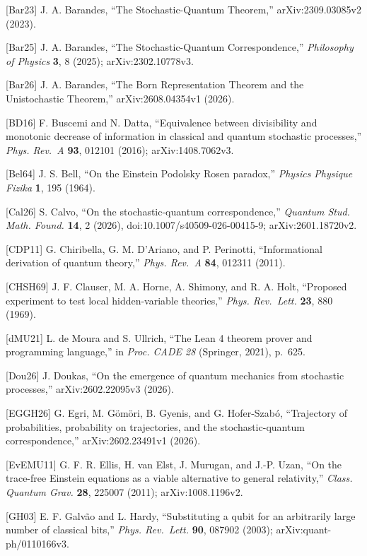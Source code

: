 \documentclass[
]{article}
\begin{document}
{[}Bar23{]} J. A. Barandes, ``The Stochastic-Quantum Theorem,''
arXiv:2309.03085v2 (2023).

{[}Bar25{]} J. A. Barandes, ``The Stochastic-Quantum Correspondence,''
\emph{Philosophy of Physics} \textbf{3}, 8 (2025); arXiv:2302.10778v3.

{[}Bar26{]} J. A. Barandes, ``The Born Representation Theorem and the
Unistochastic Theorem,'' arXiv:2608.04354v1 (2026).

{[}BD16{]} F. Buscemi and N. Datta, ``Equivalence between divisibility
and monotonic decrease of information in classical and quantum
stochastic processes,'' \emph{Phys. Rev.~A} \textbf{93}, 012101 (2016);
arXiv:1408.7062v3.

{[}Bel64{]} J. S. Bell, ``On the Einstein Podolsky Rosen paradox,''
\emph{Physics Physique Fizika} \textbf{1}, 195 (1964).

{[}Cal26{]} S. Calvo, ``On the stochastic-quantum correspondence,''
\emph{Quantum Stud. Math. Found.} \textbf{14}, 2 (2026),
doi:10.1007/s40509-026-00415-9; arXiv:2601.18720v2.

{[}CDP11{]} G. Chiribella, G. M. D'Ariano, and P. Perinotti,
``Informational derivation of quantum theory,'' \emph{Phys. Rev.~A}
\textbf{84}, 012311 (2011).

{[}CHSH69{]} J. F. Clauser, M. A. Horne, A. Shimony, and R. A. Holt,
``Proposed experiment to test local hidden-variable theories,''
\emph{Phys. Rev.~Lett.} \textbf{23}, 880 (1969).

{[}dMU21{]} L. de Moura and S. Ullrich, ``The Lean 4 theorem prover and
programming language,'' in \emph{Proc. CADE 28} (Springer, 2021),
p.~625.

{[}Dou26{]} J. Doukas, ``On the emergence of quantum mechanics from
stochastic processes,'' arXiv:2602.22095v3 (2026).

{[}EGGH26{]} G. Egri, M. Gömöri, B. Gyenis, and G. Hofer-Szabó,
``Trajectory of probabilities, probability on trajectories, and the
stochastic-quantum correspondence,'' arXiv:2602.23491v1 (2026).

{[}EvEMU11{]} G. F. R. Ellis, H. van Elst, J. Murugan, and J.-P. Uzan,
``On the trace-free Einstein equations as a viable alternative to
general relativity,'' \emph{Class. Quantum Grav.} \textbf{28}, 225007
(2011); arXiv:1008.1196v2.

{[}GH03{]} E. F. Galvão and L. Hardy, ``Substituting a qubit for an
arbitrarily large number of classical bits,'' \emph{Phys. Rev.~Lett.}
\textbf{90}, 087902 (2003); arXiv:quant-ph/0110166v3.
\end{document}
